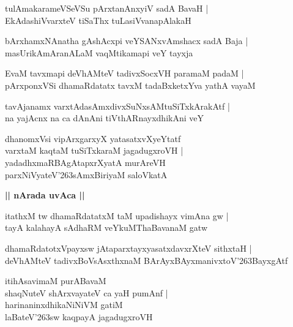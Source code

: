 \documentclass[twoside,12pt,openright]{book}
\def\S{\char'263}
\newcounter{shloka}[chapter]
\def\uvaca#1{\centerline{{\large\textbf{#1}}}}
\begin{document}
\begin{shloka}%
tulAmakarameVSeVSu pArxtanAnxyiV sadA BavaH |\\
EkAdashiVvarxteV tiSaThx tuLasiVvanapAlakaH 
\end{shloka}

\begin{shloka}%
bArxhamxNAnatha gAshAcxpi veYSANxvAmshacx sadA Baja |\\
masUrikAmAranALaM vaqMtikamapi veY tayxja
\end{shloka}

\begin{shloka}%
EvaM tavxmapi deVhAMteV  tadivxSocxVH paramaM padaM |\\
pArxponxVSi dhamaRdatatx tavxM tadaBxketxYva yathA vayaM 
\end{shloka}

\begin{shloka}%
tavAjanamx varxtAdasAmxdivxSuNxsAMtuSiTxkArakAtf |\\
na yajAcnx na ca dAnAni tiVthARnayxdhikAni veY
\end{shloka}

\begin{shloka}%
dhanomxVsi vipArxgarxyX yatasatxvXyeYtatf \\
varxtaM kaqtaM tuSiTxkaraM jagadugxroVH |\\
yadadhxmaRBAgAtapxrXyatA murAreVH  \\
parxNiVyateV\S sAmxBiriyaM saloVkatA
\end{shloka}

\uvaca{|| nArada uvAca ||}

\begin{shloka}%
itathxM tw dhamaRdatatxM taM upadishayx vimAna gw |\\
tayA kalahayA sAdhaRM veYkuMThaBavanaM gatw 
\end{shloka}

\begin{shloka}%
dhamaRdatotxVpayxsw jAtaparxtayxyasatxdavxrXteV sithxtaH |\\
deVhAMteV tadivxBoVsAsxthxnaM BArAyxBAyxmanivxtoV\S BayxgAtf
\end{shloka}

\begin{shloka}%
itihAsavimaM purABavaM \\
shaqNuteV shArxvayateV ca yaH pumAnf |\\
harinaninxdhikaNiNiVM gatiM \\
laBateV\S sw kaqpayA jagadugxroVH 
\end{shloka}
\end{document}
